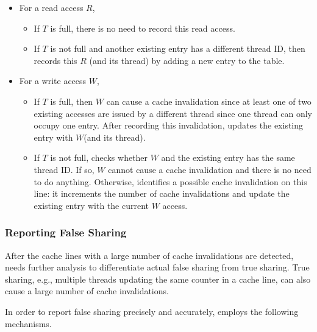 \begin{itemize}
\item
  For a read access $R$, 
  \begin{itemize}
    \item
      If $T$ is full, there is no need to record this read access.
    \item
      If $T$ is not full and another existing entry has a different thread
      ID, then \Predator{} records this $R$ (and its thread) by adding a new entry to the table. 
  \end{itemize}
\item
  For a write access $W$, 
  \begin{itemize}
    \item
      If $T$ is full, then $W$ can cause a cache invalidation since at least one of two existing accesses are issued by a different thread since one thread can only occupy one entry.
      After recording this invalidation, \Predator{} updates the
      existing entry with $W$(and its thread).
    \item
      If $T$ is not full,
      \Predator{} checks whether $W$ and the existing entry has the same thread ID. If so, $W$ cannot cause a cache invalidation and there is no need to do anything. Otherwise, \Predator{} identifies a possible cache invalidation on this line: it increments the number of cache invalidations and update the existing entry with the current $W$ access.
  \end{itemize}
\end{itemize}

\subsubsection{Reporting False Sharing}
\label{sec:predatorcallsite}

After the cache lines with a large number of cache invalidations are detected,
\Predator{} needs further analysis to differentiate actual false sharing from true sharing. 
True sharing, e.g., multiple threads updating the same counter in a cache line, can also cause a large number of cache invalidations.

In order to report false sharing precisely and accurately,  
\Predator{} employs the following mechanisms. 

